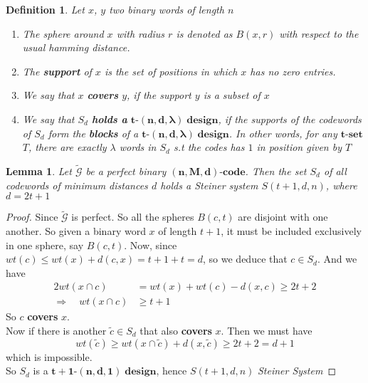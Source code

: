 \documentclass{article}
\newtheorem{lemma}[theorem]{Lemma}
\newtheorem{definition}[theorem]{Definition}
\numberwithin{equation}{theorem}
\numberwithin{figure}{theorem}
\newcommand{\tParamDesign}[4]{\ensuremath{\bm{#1\mbox{-}(#2,#3,#4)\; design}}}
\newcommand{\steinerSystem}[3]{\ensuremath{{S(#1,#2,#3)}}}
\newcommand{\pluralMyBlock}{\textbf{blocks}}
\newcommand{\cCodes}{\ensuremath{\widetilde{\mathscr{G}}}}
\newcommand{\tSet}[1]{\ensuremath{\bm{#1\mbox{-}{set}}}}
\newcommand{\code}[3]{\ensuremath{\bm{(#1,#2,#3)\mbox{-}code}}}
\begin{document}
\begin{definition}
	Let $x$, $y$ two binary words of length $n$
	\begin{enumerate}
		\item The sphere around $x$ with radius $r$ is denoted as $B(x,r)$ with respect to the usual hamming distance.
		\item The \textbf{support} of $x$ is the set of positions in which $x$ has no zero entries.
		\item We say that $x$ \textbf{covers} $y$, if the support $y$ is a subset of $x$
		\item We say that $S_d$ \textbf{holds a } {\tParamDesign{t}{n}{d}{\lambda}}, if the supports of the codewords of $S_d$ form the {\pluralMyBlock} of a {\tParamDesign{t}{n}{d}{\lambda}}. In other words, for any {\tSet{t}} $T$, there are exactly $\lambda$ words in $S_d$ s.t the codes has $1$ in position given by $T$
	\end{enumerate}
\end{definition}

\begin{lemma}\label{perfectCdDesign}
Let {\cCodes} be a perfect binary {\code{n}{M}{d}}. Then the set $S_d$ of all codewords of minimum distances $d$ holds a \emph{Steiner system} \steinerSystem{t+1}{d}{n}, where $d = 2t + 1$
\end{lemma}

\begin{proof}
Since {\cCodes} is perfect. So all the spheres $B(c,t)$ are disjoint with one another. So given a binary word $x$ of length $t+1$, it must be included exclusively in one sphere, say $B(c,t)$. Now, since $wt(c) \leq wt(x) + d(c,x) = t + 1 + t = d$, so we deduce that $c \in S_d$. And we have
\begin{align*}
	2wt(x \cap c) &= wt(x) + wt(c) - d(x,c) \geq 2t+2 \\
	\Rightarrow \quad wt(x\cap c) &\geq t + 1
\end{align*}
So $c$ \textbf{covers} $x$. \\
Now if there is another $\tilde{c} \in S_d$ that also \textbf{covers} $x$. Then we must have 
\[
	wt(\tilde{c}) \geq wt(x\cap \tilde{c}) + d(x,\tilde{c}) \geq 2t + 2 = d + 1
\]
 which is impossible. \\
So $S_d$ is a \tParamDesign{t+1}{n}{d}{1}, hence \steinerSystem{t+1}{d}{n} \emph{Steiner System}
\end{proof}
\end{document}

